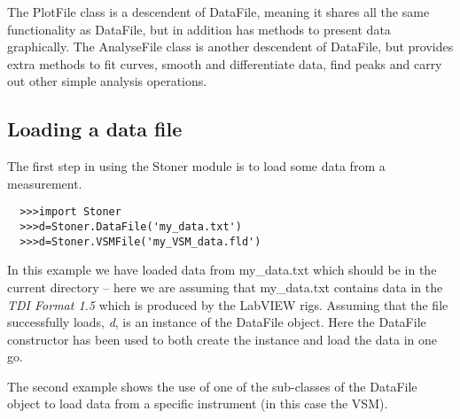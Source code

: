 \documentclass[a4paper,11pt]{scrartcl}
\begin{document}
The PlotFile class is a descendent of DataFile, meaning it shares all the same
functionality as DataFile, but in addition has methods to present data
graphically. The AnalyseFile class is another descendent of DataFile, but
provides extra methods to fit curves, smooth and differentiate data, find peaks
and carry out other simple analysis operations.

\subsection{Loading a data file}

The first step in using the Stoner module is to load some data from a
measurement.

\begin{verbatim}
  >>>import Stoner
  >>>d=Stoner.DataFile('my_data.txt')
  >>>d=Stoner.VSMFile('my_VSM_data.fld')
\end{verbatim}

In this example we have loaded data from my\_data.txt which should be in the
current directory -- here we are assuming that my\_data.txt contains data in the
\textit{TDI Format 1.5} which is produced by the LabVIEW rigs. Assuming that the
file successfully loads, \textit{d}, is an instance of the DataFile object. Here
the DataFile constructor has been used to both create the instance and load the
data in one go.

The second example shows the use of one of the sub-classes of the DataFile object to load data from a specific instrument (in this case the VSM).

\end{document}
